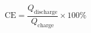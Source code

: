 \documentclass[preview]{standalone}
\begin{document}
\[\text{CE} = \frac{Q_\text{discharge}}{Q_\text{charge}} \times 100\% \tag{3.13}\]
\end{document}
